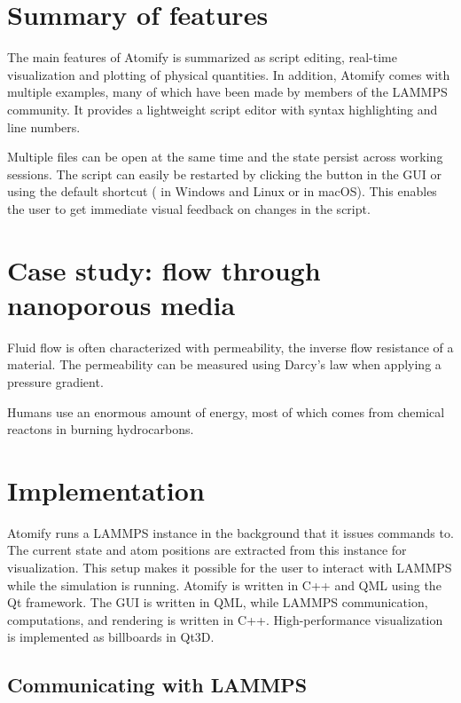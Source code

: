 \documentclass[aps,pre,twocolumn,letterpaper,floatfix,nofootinbib]{revtex4}
\begin{document}
\section{\label{sec:features}Summary of features}
The main features of Atomify is summarized as script editing,
real-time visualization and plotting of physical quantities.
In addition, Atomify comes with multiple examples,
many of which have been made by members of the LAMMPS community.
It provides a lightweight script editor with syntax highlighting and line numbers.

Multiple files can be open at the same time and the state persist across working sessions.
The script can easily be restarted by clicking the button in the GUI or using
the default shortcut ( in Windows and Linux or  in macOS).
This enables the user to get immediate visual feedback on changes in the script.

\section{\label{sec:casestudy}Case study: flow through nanoporous media}
Fluid flow is often characterized with permeability, the inverse flow resistance of a material.
The permeability can be measured using Darcy's law when applying a pressure gradient.

Humans use an enormous amount of energy, most of which comes from chemical reactons in burning hydrocarbons.


\section{\label{sec:implementation}Implementation}

Atomify runs a LAMMPS instance in the background that it issues commands to.
The current state and atom positions are extracted from this instance for
visualization.
This setup makes it possible for the user to interact with LAMMPS while the
simulation is running.
Atomify is written in C++ and QML using the Qt framework.
The GUI is written in QML, while LAMMPS communication,
computations, and rendering is written in C++.
High-performance visualization is implemented as billboards in Qt3D.

\subsection{Communicating with LAMMPS}
\end{document}
